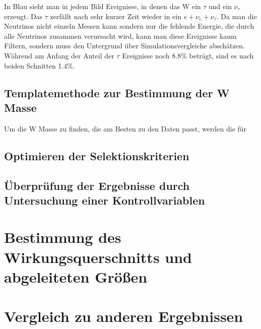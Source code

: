 \documentclass[a4paper,12pt]{article}
\begin{document}
In Blau sieht man in jedem Bild Ereignisse, in denen das W ein $τ$ und ein $ν_τ$ erzeugt. Das $τ$
zerfällt nach sehr kurzer Zeit wieder in ein $e + ν_e + ν_τ$. Da man die Neutrinos nicht einzeln
Messen kann sondern nur die fehlende Energie, die durch alle Neutrinos zusammen verursacht wird,
kann man diese Ereignisse kaum Filtern, sondern muss den Untergrund über Simulationsvergleiche
abschätzen. Während am Anfang der Anteil der $τ$ Ereignisse noch 8.8\% beträgt, sind es nach beiden
Schnitten 1.4\%.

\subsection{Templatemethode zur Bestimmung der W Masse}
Um die W Masse zu finden, die am Besten zu den Daten passt, werden die für 


\subsection{Optimieren der Selektionskriterien}
\subsection{Überprüfung der Ergebnisse durch Untersuchung einer Kontrollvariablen}

\section{Bestimmung des Wirkungsquerschnitts und abgeleiteten Größen}


\section{Vergleich zu anderen Ergebnissen}

%
\end{document}
